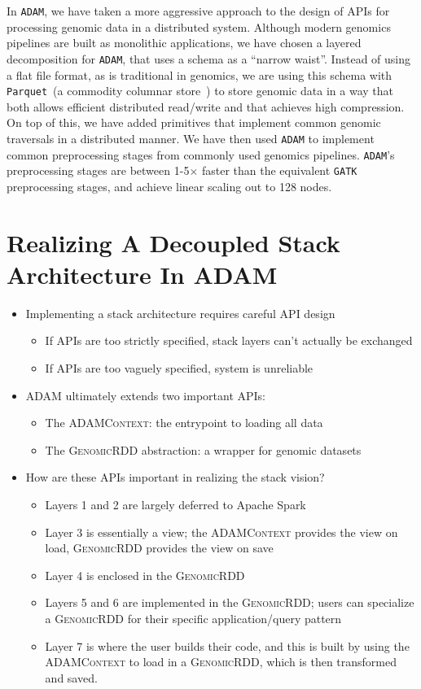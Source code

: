 \documentclass[phd]{ucbthesis}
\begin{document}
In \texttt{ADAM}, we have taken a more aggressive approach to the design of APIs for processing genomic data
in a distributed system. Although modern genomics pipelines are built as monolithic applications, we have
chosen a layered decomposition for \texttt{ADAM}, that uses a schema as a ``narrow waist''. Instead of using
a flat file format, as is traditional in genomics, we are using this schema with \texttt{Parquet}~(a commodity columnar
store~\cite{parquet}) to store genomic data in a way that both allows efficient distributed read/write and that
achieves high compression. On top of this, we have added primitives that implement common genomic traversals
in a distributed manner. We have then used \texttt{ADAM} to implement common preprocessing stages from
commonly used genomics pipelines. \texttt{ADAM}'s preprocessing stages are between 1-5$\times$ faster than the
equivalent \texttt{GATK} preprocessing stages, and achieve linear scaling out to 128 nodes.

\section{Realizing A Decoupled Stack Architecture In \textsc{ADAM}}
\label{sec:realizing-stack-architecture}

\begin{itemize}
\item Implementing a stack architecture requires careful API design
  \begin{itemize}
  \item If APIs are too strictly specified, stack layers can't actually be exchanged
  \item If APIs are too vaguely specified, system is unreliable
  \end{itemize}
\item \textsc{ADAM} ultimately extends two important APIs:
  \begin{itemize}
  \item The \textsc{ADAMContext}: the entrypoint to loading all data
  \item The \textsc{GenomicRDD} abstraction: a wrapper for genomic datasets
  \end{itemize}
\item How are these APIs important in realizing the stack vision?
  \begin{itemize}
  \item Layers 1 and 2 are largely deferred to Apache Spark
  \item Layer 3 is essentially a view; the \textsc{ADAMContext} provides the view
    on load, \textsc{GenomicRDD} provides the view on save
  \item Layer 4 is enclosed in the \textsc{GenomicRDD}
  \item Layers 5 and 6 are implemented in the \textsc{GenomicRDD}; users can
    specialize a \textsc{GenomicRDD} for their specific application/query pattern
  \item Layer 7 is where the user builds their code, and this is built by
    using the \textsc{ADAMContext} to load in a \textsc{GenomicRDD}, which is then
    transformed and saved.
  \end{itemize}
\end{itemize}
\end{document}
